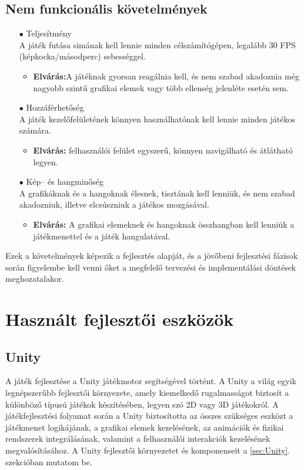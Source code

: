 \documentclass[
]{thesis-ekf}
\theoremstyle{definition}
\theoremstyle{remark}
\begin{document}
\subsection{Nem funkcionális követelmények}
\begin{itemize}
	\item[$\bullet$] Teljesítmény \\ A játék futása simának kell lennie minden célszámítógépen, legalább 30 FPS (képkocka/másodperc) sebességgel.
	\begin{itemize}
		\item \textbf{Elvárás:}A játéknak gyorsan reagálnia kell, és nem szabad akadoznia még nagyobb szintű grafikai elemek vagy több ellenség jelenléte esetén sem.
	\end{itemize}
	\item[$\bullet$] Hozzáférhetőség\\ A játék kezelőfelületének könnyen használhatónak kell lennie minden játékos számára.
	\begin{itemize}
		\item \textbf{Elvárás:} felhasználói felület egyszerű, könnyen navigálható és átlátható legyen.
	\end{itemize}
	\item[$\bullet$] Kép-- és hangminőség\\A grafikáknak és a hangoknak élesnek, tisztának kell lenniük, és nem szabad akadozniuk, illetve elcsúszniuk a játékos mozgásával.
	\begin{itemize}
		\item \textbf{Elvárás:} A grafikai elemeknek és hangoknak összhangban kell lenniük a játékmenettel és a játék hangulatával.
	\end{itemize}
\end{itemize}
Ezek a követelmények képezik a fejlesztés alapját, és a jövőbeni fejlesztési fázisok során figyelembe kell venni őket a megfelelő tervezési és implementálási döntések meghozatalakor.

\section{Használt fejlesztői eszközök}
\subsection{Unity}
A játék fejlesztése a Unity játékmotor segítségével történt. A Unity a világ egyik legnépszerűbb fejlesztői környezete, amely kiemelkedő rugalmasságot biztosít a különböző típusú játékok készítésében, legyen szó 2D vagy 3D játékokról. A játékfejlesztési folyamat során a Unity biztosította az összes szükséges eszközt a játékmenet logikájának, a grafikai elemek kezelésének, az animációk és fizikai rendszerek integrálásának, valamint a felhasználói interakciók kezelésének megvalósításához. A Unity fejlesztői környezetet és komponenseit a \ref{sec:Unity}. szekcióban mutatom be.
\end{document}
